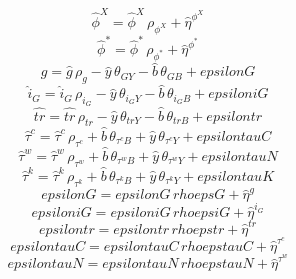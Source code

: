 \begin{dmath}
{\hat{\phi}^X}={\hat{\phi}^X}\, {\rho_{\phi^X}}+{\hat{\eta}^{\phi^X}}
\end{dmath}
\begin{dmath}
{\hat{\phi}^*}={\hat{\phi}^*}\, {\rho_{\phi^*}}+{\hat{\eta}^{\phi^*}}
\end{dmath}
\begin{dmath}
{\hat{g}}={\hat{g}}\, {\rho_{g}}-{\hat{y}}\, {\theta_{GY}}-{\hat{b}}\, {\theta_{GB}}+{epsilonG}
\end{dmath}
\begin{dmath}
{\hat{i}_G}={\hat{i}_G}\, {\rho_{i_G}}-{\hat{y}}\, {\theta_{i_GY}}-{\hat{b}}\, {\theta_{i_GB}}+{epsiloniG}
\end{dmath}
\begin{dmath}
{\hat{tr}}={\hat{tr}}\, {\rho_{tr}}-{\hat{y}}\, {\theta_{trY}}-{\hat{b}}\, {\theta_{trB}}+{epsilontr}
\end{dmath}
\begin{dmath}
{\hat{\tau}^c}={\hat{\tau}^c}\, {\rho_{\tau^c}}+{\hat{b}}\, {\theta_{\tau^cB}}+{\hat{y}}\, {\theta_{\tau^cY}}+{epsilontauC}
\end{dmath}
\begin{dmath}
{\hat{\tau}^w}={\hat{\tau}^w}\, {\rho_{\tau^w}}+{\hat{b}}\, {\theta_{\tau^wB}}+{\hat{y}}\, {\theta_{\tau^wY}}+{epsilontauN}
\end{dmath}
\begin{dmath}
{\hat{\tau}^k}={\hat{\tau}^k}\, {\rho_{\tau^k}}+{\hat{b}}\, {\theta_{\tau^kB}}+{\hat{y}}\, {\theta_{\tau^kY}}+{epsilontauK}
\end{dmath}
\begin{dmath}
{epsilonG}={epsilonG}\, {rhoepsG}+{\hat{\eta}^{g}}
\end{dmath}
\begin{dmath}
{epsiloniG}={epsiloniG}\, {rhoepsiG}+{\hat{\eta}^{i_G}}
\end{dmath}
\begin{dmath}
{epsilontr}={epsilontr}\, {rhoepstr}+{\hat{\eta}^{tr}}
\end{dmath}
\begin{dmath}
{epsilontauC}={epsilontauC}\, {rhoepstauC}+{\hat{\eta}^{\tau^c}}
\end{dmath}
\begin{dmath}
{epsilontauN}={epsilontauN}\, {rhoepstauN}+{\hat{\eta}^{\tau^w}}
\end{dmath}

